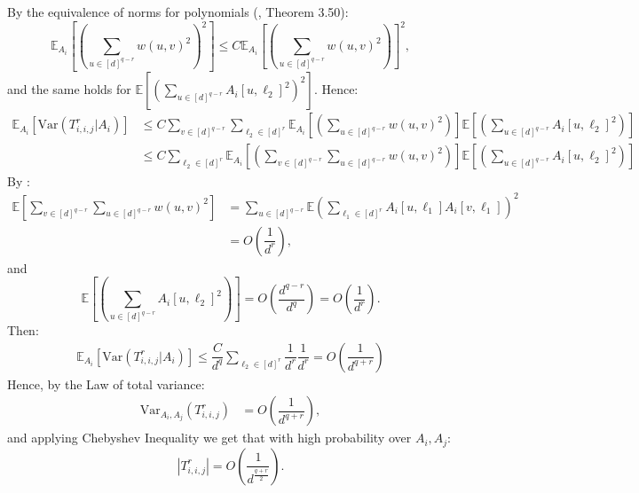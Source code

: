 \documentclass[]{article}
\numberwithin{equation}{section}
\theoremstyle{definition}
\newcommand{\EE}{\mathbb{E}}
\begin{document}
By the equivalence of norms for polynomials (\cite{janson1997gaussian}, Theorem 3.50): 
\begin{equation}
    \EE_{A_i} \left [\left ( \sum_{u \in [d]^{q-r}}w(u,v)^{2} \right )^{2}\right ] \leq C \EE_{A_i} \left [\left ( \sum_{u \in [d]^{q-r}}w(u,v)^{2} \right )\right ]^{2},
\end{equation}
and the same holds for $\EE \left [ \left (  \sum_{u \in [d]^{q-r}}A_{i}[u, \ell_2]^{2} \right )^{2} \right ]$. Hence: 
\begin{align}
    \EE_{A_i} \left [ \mathrm{Var} (T^{r}_{i,i,j}|A_i)\right ] & \leq C \sum_{v \in [d]^{q-r}} \sum_{\ell_2 \in [d]^{r}} \EE_{A_i} \left [\left ( \sum_{u \in [d]^{q-r}}w(u,v)^{2} \right )\right ] \EE \left [ \left (  \sum_{u \in [d]^{q-r}}A_{i}[u, \ell_2]^{2} \right )\right ] \\
    & \leq C  \sum_{\ell_2 \in [d]^{r}} \EE_{A_i} \left [\left ( \sum_{v \in [d]^{q-r}}\sum_{u \in [d]^{q-r}}w(u,v)^{2} \right )\right ] \EE \left [ \left (  \sum_{u \in [d]^{q-r}}A_{i}[u, \ell_2]^{2} \right )\right ]
\end{align}
By : 
\begin{align}
    \EE \left [\sum_{v \in [d]^{q-r}}\sum_{u \in [d]^{q-r}}w(u,v)^{2} \right ] &=   \sum_{u \in [d]^{q-r}} \EE \left ( \sum_{\ell_1 \in [d]^{r}} A_{i}[u, \ell_1] A_i [v, \ell_1 ]\right )^{2} \\ 
    & = O\left ( \dfrac{1}{d^{r}}\right ), 
\end{align}
and 
\begin{equation}
    \EE \left [ \left (  \sum_{u \in [d]^{q-r}}A_{i}[u, \ell_2]^{2} \right )\right ] = O\left ( \dfrac{d^{q-r}}{d^{q}}\right ) = O\left ( \dfrac{1}{d^{r}}\right ). 
\end{equation}
Then: 
\begin{align}
     \EE_{A_i} \left [ \mathrm{Var} (T^{r}_{i,i,j}|A_i)\right ] 
     \leq \dfrac{C}{d^{q}} \sum_{\ell_2 \in [d]^{r}}  \dfrac{1}{d^{r}}\dfrac{1}{d^{r}} = O\left (\dfrac{1}{d^{q+r}}\right)
\end{align}
Hence, by the Law of total variance: 
\begin{align}
    \mathrm{Var}_{A_i, A_j} \left (T^{r}_{i,i,j}\right ) & = O\left (  \dfrac{1}{d^{q+r}} \right ), 
\end{align}
and applying Chebyshev Inequality we get that with high probability over $A_i, A_j$:
\begin{equation}
    \left | T^r_{i,i,j} \right | = O \left (  \dfrac{1}{d^\frac{{q+r}}{2}}\right ). 
    \label{eq:order_t_i_i_j}
\end{equation}
\end{document}
